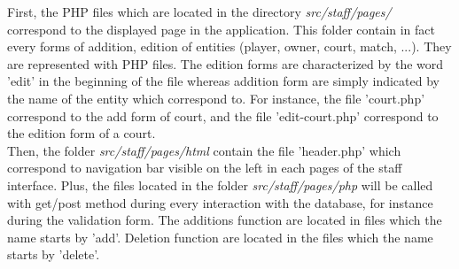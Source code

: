\documentclass{article}
\begin{document}
First, the PHP files which are located in the directory \textit{src/staff/pages/} correspond to the displayed page in the application. This folder contain in fact every forms of addition, edition of entities (player, owner, court, match, ...). They are represented with PHP files. The edition forms are characterized by the word 'edit' in the beginning of the file whereas addition form are simply indicated by the name of the entity which correspond to. For instance, the file 'court.php' correspond to the add form of court, and the file 'edit-court.php' correspond to the edition form of a court. \\
Then, the folder \textit{src/staff/pages/html} contain the file 'header.php' which correspond to navigation bar visible on the left in each pages of the staff interface.
Plus, the files located in the folder \textit{src/staff/pages/php} will be called with get/post method during every interaction with the database, for instance during the validation form. The additions function are located in files which the name starts by 'add'. Deletion function are located in the files which the name starts by 'delete'. \\
\end{document}
